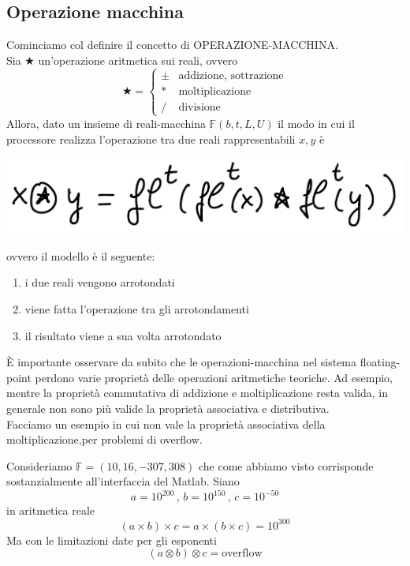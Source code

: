 \subsection{Operazione macchina}
Cominciamo col definire il concetto di OPERAZIONE-MACCHINA.\\
Sia $\bigstar$ un'operazione aritmetica sui reali, ovvero \[ \bigstar =
\begin{cases}
    \pm & \text{addizione, sottrazione} \\
    * & \text{moltiplicazione} \\
    / & \text{divisione}
\end{cases}
\]
Allora, dato un insieme di reali-macchina $\mathbb{F}(b, t, L, U)$ il modo in cui il processore realizza l'operazione tra due reali rappresentabili $x, y$ è 
\begin{center}
    \includegraphics[scale=0.65]{foto/img11}
\end{center}
ovvero il modello è il seguente:
\begin{enumerate}
    \item i due reali vengono arrotondati
    \item viene fatta l'operazione tra gli arrotondamenti
    \item il risultato viene a sua volta arrotondato
\end{enumerate}
È importante osservare da subito che le operazioni-macchina nel sistema floating-point perdono varie proprietà delle operazioni aritmetiche teoriche. Ad esempio, mentre la proprietà commutativa di addizione e moltiplicazione resta valida, in generale non sono più valide la proprietà associativa e distributiva.\\
Facciamo un esempio in cui non vale la proprietà associativa della moltiplicazione,per problemi di overflow.
\begin{esempio} \end{esempio}
Consideriamo $\mathbb{F} = (10, 16, -307, 308)$ che come abbiamo visto corrisponde sostanzialmente all'interfaccia del Matlab. Siano
\[ a = 10^{200}\,,\,b = 10^{150}\,,\,c = 10^{-50} \]
in aritmetica reale \[ (a \times b) \times c = a \times (b \times c) = 10^{300} \]
Ma con le limitazioni date per gli esponenti \[(a \otimes b) \otimes c = \text{overflow}\]
